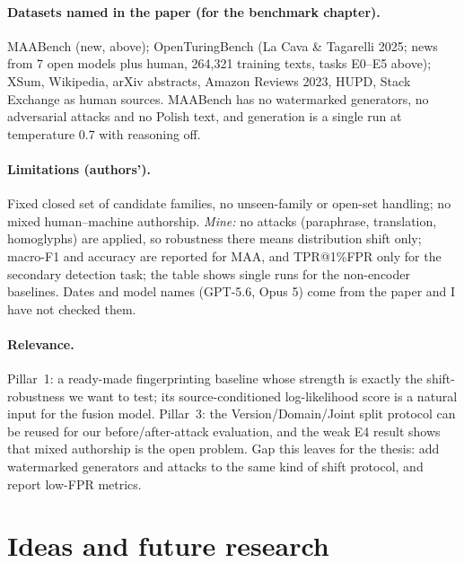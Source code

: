 \documentclass[10pt,a4paper,twocolumn]{article}
\begin{document}
\paragraph{Datasets named in the paper (for the benchmark chapter).} MAABench (new, above); OpenTuringBench (La Cava \& Tagarelli 2025; news from 7 open models plus human, 264,321 training texts, tasks E0--E5 above); XSum, Wikipedia, arXiv abstracts, Amazon Reviews 2023, HUPD, Stack Exchange as human sources. MAABench has no watermarked generators, no adversarial attacks and no Polish text, and generation is a single run at temperature 0.7 with reasoning off.

\paragraph{Limitations (authors').} Fixed closed set of candidate families, no unseen-family or open-set handling; no mixed human--machine authorship. \emph{Mine:} no attacks (paraphrase, translation, homoglyphs) are applied, so robustness there means distribution shift only; macro-F1 and accuracy are reported for MAA, and TPR@1\%FPR only for the secondary detection task; the table shows single runs for the non-encoder baselines. Dates and model names (GPT-5.6, Opus 5) come from the paper and I have not checked them.

\paragraph{Relevance.} Pillar~1: a ready-made fingerprinting baseline whose strength is exactly the shift-robustness we want to test; its source-conditioned log-likelihood score is a natural input for the fusion model. Pillar~3: the Version/Domain/Joint split protocol can be reused for our before/after-attack evaluation, and the weak E4 result shows that mixed authorship is the open problem. Gap this leaves for the thesis: add watermarked generators and attacks to the same kind of shift protocol, and report low-FPR metrics.

\section{Ideas and future research}
\end{document}
